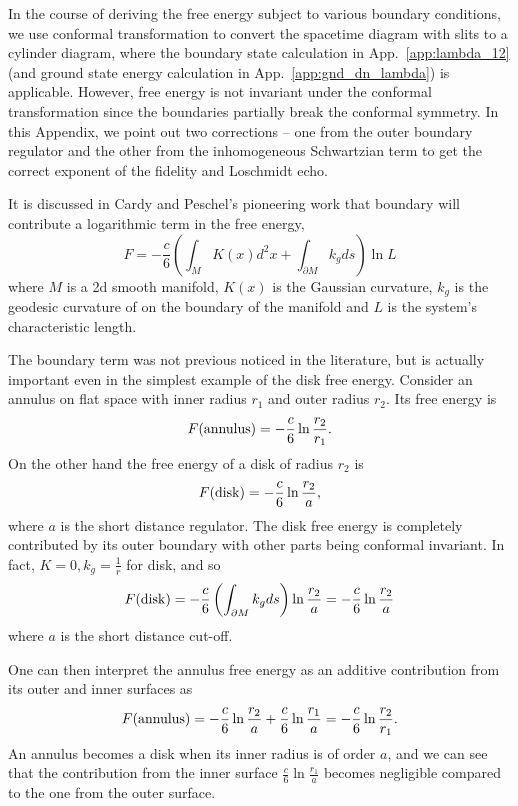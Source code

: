 
In the course of deriving the free energy subject to various boundary conditions, we use conformal transformation to convert the spacetime diagram with slits to a cylinder diagram, where the boundary state calculation in App.~\ref{app:lambda_12} (and ground state energy calculation in App.~\ref{app:gnd_dn_lambda}) is applicable. However, free energy is not invariant under the conformal transformation since the boundaries partially break the conformal symmetry. In this Appendix, we point out two corrections -- one from the outer boundary regulator and the other from the inhomogeneous Schwartzian term to get the correct exponent of the fidelity and Loschmidt echo. 

It is discussed in Cardy and Peschel's pioneering work\cite{cardy_finite-size_1988} that boundary will contribute a logarithmic term in the free energy,
\begin{equation}
F = - \frac{c}{6} \left( \int_M  K(x) d^2x + \int_{\partial M} k_g ds \right)  \ln L 
\end{equation}
where $M$ is a 2d smooth manifold, $K(x)$ is the Gaussian curvature, $k_g$ is the geodesic curvature of on the boundary of the manifold and $L$ is the system's characteristic length. 

The boundary term was not previous noticed in the literature, but is actually important even in the simplest example of the disk free energy. Consider an annulus on flat space with inner radius $r_1$ and outer radius $r_2$. Its free energy is
\begin{equation}
F({\rm annulus}) = -  \frac{c}{6} \ln \frac{r_2}{r_1} .
\end{equation}
On the other hand the free energy of a disk of radius $r_2$ is
\begin{equation}
  F( {\rm disk} ) = - \frac{c}{6} \ln \frac{r_2}{a},
\end{equation}
where $a$ is the short distance regulator. The disk free energy is completely contributed by its outer boundary with other parts being conformal invariant. In fact, $K = 0, k_g = \frac{1}{r}$ for disk, and so 
\begin{equation}
F( {\rm disk}  ) = - \frac{c}{6}  \left( \int_{\partial M} k_g ds \right)  \ln \frac{r_2}{a}  = - \frac{c}{6}  \ln \frac{r_2}{a}
\end{equation}
where $a$ is the short distance cut-off. 

One can then interpret the annulus free energy as an additive contribution from its outer and inner surfaces as
\begin{equation}
F( {\rm annulus} ) = -  \frac{c}{6} \ln \frac{r_2}{a} +  \frac{c}{6} \ln \frac{r_1}{a} = - \frac{c}{6} \ln \frac{r_2}{r_1}.
\end{equation}
An annulus becomes a disk when its inner radius is of order $a$, and we can see that the contribution from the inner surface $\frac{c}{6} \ln \frac{r_1}{a}$ becomes negligible compared to the one from the outer surface.  

